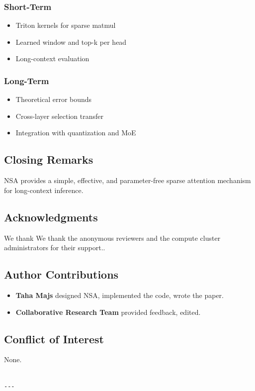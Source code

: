 \subsubsection{Short-Term}
\begin{itemize}
\item Triton kernels for sparse matmul
\item Learned window and top-k per head
\item Long-context evaluation

\end{itemize}
\subsubsection{Long-Term}
\begin{itemize}
\item Theoretical error bounds
\item Cross-layer selection transfer
\item Integration with quantization and MoE

\end{itemize}
\subsection{Closing Remarks}

NSA provides a simple, effective, and parameter-free sparse attention 
mechanism for long-context inference.

\subsection{Acknowledgments}

We thank We thank the anonymous reviewers and the compute cluster administrators for their support..

\subsection{Author Contributions}

\begin{itemize}
\item \textbf{Taha Majs} designed NSA, implemented the code, wrote the paper.
\item \textbf{Collaborative Research Team} provided feedback, edited.

\end{itemize}
\subsection{Conflict of Interest}

None.
\begin{lstlisting}

---
\end{lstlisting}